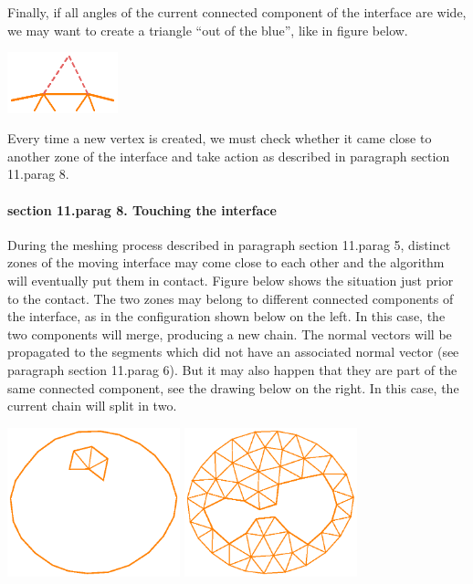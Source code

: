 Finally, if all angles of the current connected component of the interface are wide,
we may want to create a triangle ``out of the blue'', like in figure below.

\centerline{\includegraphics[width=32mm]{fill-blue.eps}}

Every time a new vertex is created, we must check whether it came close to another
zone of the interface and take action as described in paragraph \numb section 11.\numb parag 8.


\paragraph{\numb section 11.\numb parag 8. Touching the interface}

During the meshing process described in paragraph \numb section 11.\numb parag 5,
distinct zones of the moving interface may
come close to each other and the algorithm will eventually put them in contact.
Figure below shows the situation just prior to the contact.
The two zones may belong to different connected components of the interface,
as in the configuration shown below on the left.
In this case, the two components will merge, producing a new chain.
The normal vectors will be propagated to the segments which did not have an associated
normal vector (see paragraph \numb section 11.\numb parag 6).
But it may also happen that they are part of the same connected component,
see the drawing below on the right.
In this case, the current chain will split in two.

\centerline{\includegraphics[width=5cm]{touching-interf-1.eps}
\hskip5mm \includegraphics[width=5cm]{touching-interf-2.eps}}

